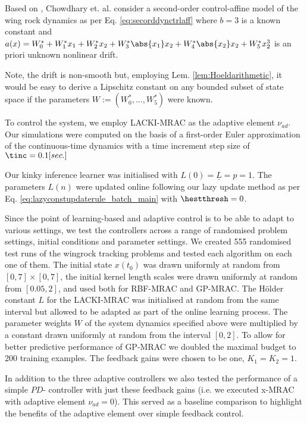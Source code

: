 Based on \cite{Monahemi1996}, Chowdhary et. al. \cite{Chowdhary2013,ChowdharyCDC2013} consider a second-order control-affine model of the wing rock dynamics as per  Eq. \ref{eq:secorddynctrlaff} 
where $b =3$ is a known constant and 
$a(x) = W_0^* + W_1^* x_1 + W_2^* x_2 + W_3^* \abs{x_1} x_2 + W_4^* \abs{x_2} x_2 + W^*_5 x_2^3$ is an priori unknown nonlinear drift. 



Note, the drift is non-smooth but, employing Lem. \ref{lem:Hoeldarithmetic}, it would be easy to derive a Lipschitz constant on any bounded subset of state space if the parameters $W := (W_0^*,\ldots, W_5^*)$ were known.

To control the system, we employ LACKI-MRAC as the adaptive element $\nu_{ad}$. Our simulations were computed on the basis of a first-order Euler approximation of the continuous-time dynamics
with a time increment step size of $\tinc = 0.1 [sec.]$

Our kinky inference learner was initialised with $L(0) =\underline L =p= 1$. The parameters $L(n)$ were  updated online following our lazy update method as per Eq. \ref{eq:lazyconstupdaterule_batch_main} with $\hestthresh = 0$. 

Since the point of learning-based and adaptive control is to be able to adapt to various settings, we test the controllers across a range of randomised problem settings, initial conditions and parameter settings.
We created 555 randomised test runs of the wingrock tracking problems and tested each algorithm on each one of them. The initial state $x(t_0)$ was drawn uniformly at random from $[0,7] \times [0,7]$, the initial kernel length scales were drawn uniformly at random from $[0.05,2]$, and used both for RBF-MRAC and GP-MRAC. The H\"older constant $L$ for the LACKI-MRAC was initialised at random from the same interval but allowed to be adapted as part of the online learning process. The parameter weights $W$ of the system dynamics specified above were multiplied by a constant drawn uniformly at random from the interval $[0,2]$. To allow for better predictive performance of GP-MRAC we doubled the maximal budget to 200 training examples. 
The feedback gains were chosen to be one, $K_1=K_2=1$. 

In addition to the three adaptive controllers we also tested the performance of a simple $PD$- controller with just these feedback gains (i.e. we executed x-MRAC with adaptive element $\nu_{ad}=0$). This served as a baseline comparison to highlight the benefits of the adaptive element over simple feedback control.

